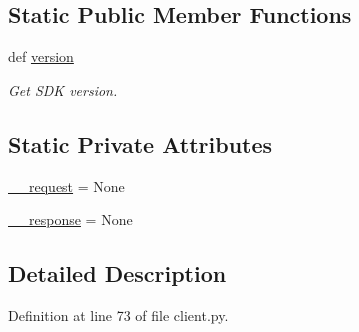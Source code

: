 \subsection*{Static Public Member Functions}
\begin{DoxyCompactItemize}
\item 
def \hyperlink{classtune_1_1management_1_1service_1_1client_1_1TuneManagementClient_afc93616f2c5e2fad000d9d273cf31eb3}{version}
\begin{DoxyCompactList}\small\item\em Get S\-D\-K version. \end{DoxyCompactList}\end{DoxyCompactItemize}
\subsection*{Static Private Attributes}
\begin{DoxyCompactItemize}
\item 
\hyperlink{classtune_1_1management_1_1service_1_1client_1_1TuneManagementClient_a2e3f42c415bc8c9bdaf55f75acddbbd5}{\-\_\-\-\_\-request} = None
\item 
\hyperlink{classtune_1_1management_1_1service_1_1client_1_1TuneManagementClient_a07773038d49e05c7e999a687f477e418}{\-\_\-\-\_\-response} = None
\end{DoxyCompactItemize}


\subsection{Detailed Description}


Definition at line 73 of file client.\-py.



